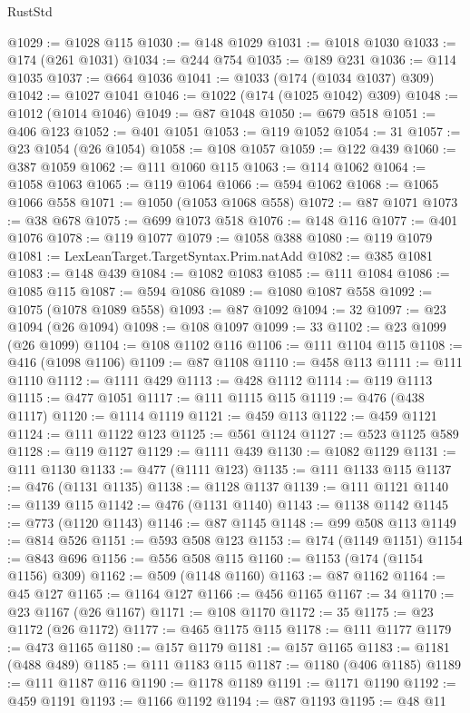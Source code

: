 \begin{lexlean}{RustStd}
\begin{coremodule}
{\begin{coremodule}
{{{{{{{{{{{{{{{{{{{{{{{{{{{{{{{{{{{{{{{{{{{{{{{{{{{{{{{{{{{{{{{{{{{{{{{{{{{{{{@1029 := @1028 @115
@1030 := @148 @1029
@1031 := @1018 @1030
@1033 := @174 (@261 @1031)
@1034 := @244 @754
@1035 := @189 @231
@1036 := @114 @1035
@1037 := @664 @1036
@1041 := @1033 (@174 (@1034 @1037) @309)
@1042 := @1027 @1041
@1046 := @1022 (@174 (@1025 @1042) @309)
@1048 := @1012 (@1014 @1046)
@1049 := @87 @1048
@1050 := @679 @518
@1051 := @406 @123
@1052 := @401 @1051
@1053 := @119 @1052
@1054 := 31
@1057 := @23 @1054 (@26 @1054)
@1058 := @108 @1057
@1059 := @122 @439
@1060 := @387 @1059
@1062 := @111 @1060 @115
@1063 := @114 @1062
@1064 := @1058 @1063
@1065 := @119 @1064
@1066 := @594 @1062
@1068 := @1065 @1066 @558
@1071 := @1050 (@1053 @1068 @558)
@1072 := @87 @1071
@1073 := @38 @678
@1075 := @699 @1073 @518
@1076 := @148 @116
@1077 := @401 @1076
@1078 := @119 @1077
@1079 := @1058 @388
@1080 := @119 @1079
@1081 := LexLeanTarget.TargetSyntax.Prim.natAdd
@1082 := @385 @1081
@1083 := @148 @439
@1084 := @1082 @1083
@1085 := @111 @1084
@1086 := @1085 @115
@1087 := @594 @1086
@1089 := @1080 @1087 @558
@1092 := @1075 (@1078 @1089 @558)
@1093 := @87 @1092
@1094 := 32
@1097 := @23 @1094 (@26 @1094)
@1098 := @108 @1097
@1099 := 33
@1102 := @23 @1099 (@26 @1099)
@1104 := @108 @1102 @116
@1106 := @111 @1104 @115
@1108 := @416 (@1098 @1106)
@1109 := @87 @1108
@1110 := @458 @113
@1111 := @111 @1110
@1112 := @1111 @429
@1113 := @428 @1112
@1114 := @119 @1113
@1115 := @477 @1051
@1117 := @111 @1115 @115
@1119 := @476 (@438 @1117)
@1120 := @1114 @1119
@1121 := @459 @113
@1122 := @459 @1121
@1124 := @111 @1122 @123
@1125 := @561 @1124
@1127 := @523 @1125 @589
@1128 := @119 @1127
@1129 := @1111 @439
@1130 := @1082 @1129
@1131 := @111 @1130
@1133 := @477 (@1111 @123)
@1135 := @111 @1133 @115
@1137 := @476 (@1131 @1135)
@1138 := @1128 @1137
@1139 := @111 @1121
@1140 := @1139 @115
@1142 := @476 (@1131 @1140)
@1143 := @1138 @1142
@1145 := @773 (@1120 @1143)
@1146 := @87 @1145
@1148 := @99 @508 @113
@1149 := @814 @526
@1151 := @593 @508 @123
@1153 := @174 (@1149 @1151)
@1154 := @843 @696
@1156 := @556 @508 @115
@1160 := @1153 (@174 (@1154 @1156) @309)
@1162 := @509 (@1148 @1160)
@1163 := @87 @1162
@1164 := @45 @127
@1165 := @1164 @127
@1166 := @456 @1165
@1167 := 34
@1170 := @23 @1167 (@26 @1167)
@1171 := @108 @1170
@1172 := 35
@1175 := @23 @1172 (@26 @1172)
@1177 := @465 @1175 @115
@1178 := @111 @1177
@1179 := @473 @1165
@1180 := @157 @1179
@1181 := @157 @1165
@1183 := @1181 (@488 @489)
@1185 := @111 @1183 @115
@1187 := @1180 (@406 @1185)
@1189 := @111 @1187 @116
@1190 := @1178 @1189
@1191 := @1171 @1190
@1192 := @459 @1191
@1193 := @1166 @1192
@1194 := @87 @1193
@1195 := @48 @11
}}}}}}}}}}}}}}}}}}}}}}}}}}}}}}}}}}}}}}}}}}}}}}}}}}}}}}}}}}}}}}}}}}}}}}}}}}}}}}
\end{coremodule}}
\end{coremodule}
\end{lexlean}
